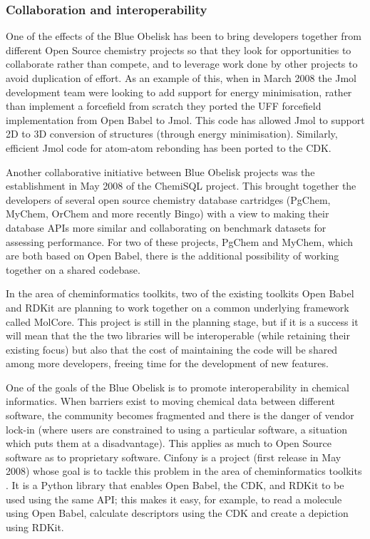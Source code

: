 \documentclass[10pt]{bmc_article}
\newenvironment{bmcformat}{\fussy\setboolean{publ}{true}}{\fussy}
\begin{document}
\begin{bmcformat}
  \subsubsection*{Collaboration and interoperability}

One of the effects of the Blue Obelisk has been to bring developers
together from different Open Source chemistry projects so that they
look for opportunities to collaborate rather than compete, and to
leverage work done by other projects to avoid duplication of effort.
As an example of this, when in March 2008 the Jmol development team
were looking to add support for energy minimisation, rather than
implement a forcefield from scratch they ported the UFF forcefield
implementation from Open Babel to Jmol. This code has allowed Jmol to
support 2D to 3D conversion of structures (through energy
minimisation). Similarly, efficient Jmol code for atom-atom rebonding
has been ported to the CDK.

Another collaborative initiative between Blue Obelisk projects was the establishment in May 2008 of
the ChemiSQL project. This brought together the developers of several
open source chemistry database cartridges (PgChem, MyChem, OrChem and
more recently Bingo) with a view to making their database APIs more
similar and collaborating on benchmark datasets for assessing
performance. For two of these projects, PgChem and MyChem, which are both based on
Open Babel, there is the additional possibility of working together on a shared
codebase.

In the area of cheminformatics toolkits, two of the existing toolkits
Open Babel and RDKit are planning to work together on a common
underlying framework called MolCore.\cite{WebMolCore} This project is still in the
planning stage, but if it is a success it will mean that the the two
libraries will be interoperable (while retaining their existing focus)
but also that the cost of maintaining the code will be shared among
more developers, freeing time for the development of new features.

One of the goals of the Blue Obelisk is to promote interoperability in chemical
informatics. When barriers exist to moving chemical data between
different software, the community becomes fragmented and there is
the danger of vendor lock-in (where users are constrained to using
a particular software, a situation which puts them at a
disadvantage). This applies as much to Open Source software as to
proprietary software. Cinfony is a project (first release in May 2008)
whose goal is to tackle this problem in the area of cheminformatics
toolkits \cite{OBoyleCinfony2008}.
It is a Python library that enables Open Babel, the CDK, and RDKit to
be used using the same API; this makes it easy, for example, to read a
molecule using Open Babel, calculate descriptors using the CDK and
create a depiction using RDKit.


\end{bmcformat}
\end{document}

